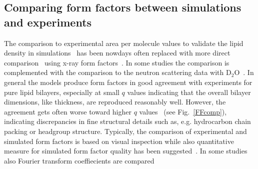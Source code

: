 \documentclass[aps,prl,superscriptaddress,twocolumn]{revtex4}
\begin{document}

\subsection{Comparing form factors between simulations and experiments}

The comparison to experimental area per molecule values to validate the lipid density in simulations~\cite{tieleman97} has
been nowdays often replaced with more direct comparison~\cite{nagle00} using x-ray form 
factors~\cite{hogberg08,chiu09,klauda10,dickson12,jambeck12,lim12,klauda12,jambeck13,chowdhary13,lee14,maciejewski14,dickson14,tjornhammar14,madej15,kulig15b}.
In some studies the comparison is complemented with the comparison to the neutron scattering 
data with D$_2$O~\cite{dickson12,jambeck12,lee14,dickson14,tjornhammar14,madej15}.
In general the models produce form factors in good agreement with experiments for pure lipid bilayers, especially at small $q$ values indicating 
that the overall bilayer dimensions, like thickness, are reproduced reasonably well. However, the agreement gets often worse
toward higher $q$ 
values~\cite{chiu09,klauda10,klauda12,dickson12,lim12,jambeck12,chowdhary13,jambeck13,lee14,maciejewski14,dickson14,kulig15b,madej15}
(see Fig.~\ref{FFcomp}), indicating discrepancies in fine structural details such as, e.g. hydrocarbon chain packing or headgroup structure.
Typically, the comparison of experimental and simulated form factors is based on visual inspection while also quantitative measure
for simulated form factor quality has been suggested~\cite{kucerka10}. In some studies also Fourier transform coeffiecients are
compared~\cite{benz05}
\end{document}
